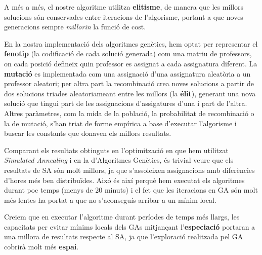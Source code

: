 \documentclass[10pt,twocolumn]{article}
\begin{document}
A més a més, el nostre algoritme utilitza \textbf{elitisme}, de manera que les millors solucions són conservades entre iteracions de l'algorisme, portant a que noves generacions sempre \textit{millorin} la funció de cost.

En la nostra implementació dels algoritmes genètics, hem optat per representar el \textbf{fenotip} (la codificació de cada solució generada) com una matriu de professors, on cada posició defineix quin professor es assignat a cada assignatura diferent. La \textbf{mutació} es implementada com una assignació d'una assignatura aleatòria a un professor aleatori; per altra part la recombinació crea noves solucions a partir de dos solucions triades aleatoriameant entre les millors (la \textbf{élit}), generant una nova solució que tingui part de les assignacions d'assigatures d'una i part de l'altra. Altres paràmetres, com la mida de la població, la probabilitat de recombinació o la de mutació, s'han triat de forme empírica a base d'executar l'algorisme i buscar les constants que donaven els millors resultats.

Comparant els resultats obtinguts en l'optimització en que hem utilitzat \textit{Simulated Annealing} i en la d'Algoritmes Genètics, és trivial veure que els resultats de SA són molt millors, ja que s'assoleixen assignacions amb diferències d'hores més ben distribuïdes. Aixó és així perquè hem executat els algoritmes durant poc temps (menys de 20 minuts) i el fet que les iteracions en GA són molt més lentes ha portat a que no s'aconseguís arribar a un mínim local.

Creiem que en executar l'algoritme durant períodes de temps més llargs, les capacitats per evitar mínims locals dels GAs mitjançant l'\textbf{especiació} portaran a una millora de resultats respecte al SA, ja que l'exploració realitzada pel GA cobrirà molt més \textbf{espai}.
\end{document}
